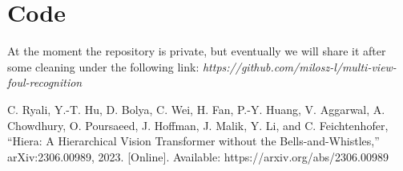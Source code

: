 \documentclass[conference]{IEEEtran}
\begin{document}
\section{Code}
At the moment the repository is private, but eventually we will share it after some cleaning under the following link: \textit{https://github.com/milosz-l/multi-view-foul-recognition}


\begin{thebibliography}{00}
     C. Ryali, Y.-T. Hu, D. Bolya, C. Wei, H. Fan, P.-Y. Huang, V. Aggarwal, A. Chowdhury, O. Poursaeed, J. Hoffman, J. Malik, Y. Li, and C. Feichtenhofer, ``Hiera: A Hierarchical Vision Transformer without the Bells-and-Whistles,'' arXiv:2306.00989, 2023. [Online]. Available: https://arxiv.org/abs/2306.00989

\end{thebibliography}
\vspace{12pt}
\end{document}
